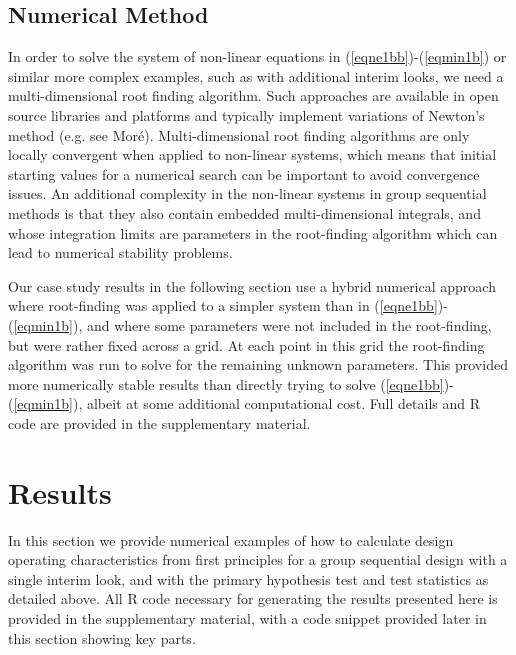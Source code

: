 \documentclass{article}
\begin{document}
\subsection{Numerical Method}
In order to solve the system of non-linear equations in (\ref{eqne1bb})-(\ref{eqmin1b}) or similar more complex examples, such as with additional interim looks, we need a multi-dimensional root finding algorithm. Such approaches are available in open source libraries and platforms and typically implement variations of Newton's method (e.g. see Mor\'e\citep{More1979}). Multi-dimensional root finding algorithms are only locally convergent when applied to non-linear systems, which means that initial starting values for a numerical search can be important to avoid convergence issues. An additional complexity in the non-linear systems in group sequential methods is that they also contain embedded multi-dimensional integrals, and whose integration limits are parameters in the root-finding algorithm which can lead to numerical stability problems. 

Our case study results in the following section use a hybrid numerical approach where root-finding was applied to a simpler system than in (\ref{eqne1bb})-(\ref{eqmin1b}), and where some parameters were not included in the root-finding, but were rather fixed across a grid. At each point in this grid the root-finding algorithm was run to solve for the remaining unknown parameters. This provided more numerically stable results than directly trying to solve (\ref{eqne1bb})-(\ref{eqmin1b}), albeit at some additional computational cost. Full details and R code are provided in the supplementary material. 


\section{Results}\label{casestudy}
In this section we provide numerical examples of how to calculate design operating characteristics from first principles for a group sequential design with a single interim look, and with the primary hypothesis test and test statistics as detailed above. All R code necessary for generating the results presented here is provided in the supplementary material, with a code snippet provided later in this section showing key parts. 
\end{document}
